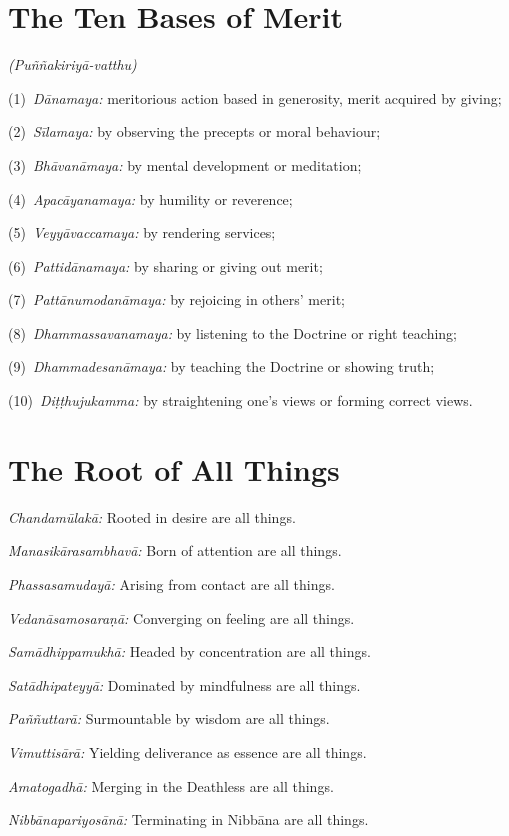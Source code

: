 \ifhandbookedition
\clearpage
\fi

\section*{The Ten Bases of Merit}

\emph{(Puññakiriyā-vatthu)}

(1)~\emph{Dānamaya:} meritorious action based in generosity, merit acquired by giving;

(2)~\emph{Sīlamaya:} by observing the precepts or moral behaviour;

(3)~\emph{Bhāvanāmaya:} by mental development or meditation;

(4)~\emph{Apacāyanamaya:} by humility or reverence;

(5)~\emph{Veyyāvaccamaya:} by rendering services;

(6)~\emph{Pattidānamaya:} by sharing or giving out merit;

(7)~\emph{Pattānumodanāmaya:} by rejoicing in others' merit;

(8)~\emph{Dhammassavanamaya:} by listening to the Doctrine or right teaching;

(9)~\emph{Dhammadesanāmaya:} by teaching the Doctrine or showing truth;

(10)~\emph{Diṭṭhujukamma:} by straightening one's views or forming correct views.

\clearpage

\section*{The Root of All Things}

\emph{Chandamūlakā:} Rooted in desire are all things.

\emph{Manasikārasambhavā:} Born of attention are all things.

\emph{Phassasamudayā:} Arising from contact are all things.

\emph{Vedanāsamosaraṇā:} Converging on feeling are all things.

\emph{Samādhippamukhā:} Headed by concentration are all things.

\emph{Satādhipateyyā:} Dominated by mindfulness are all things.

\emph{Paññuttarā:} Surmountable by wisdom are all things.

\emph{Vimuttisārā:} Yielding deliverance as essence are all things.

\emph{Amatogadhā:} Merging in the Deathless are all things.

\emph{Nibbānapariyosānā:} Terminating in Nibbāna are all things.


